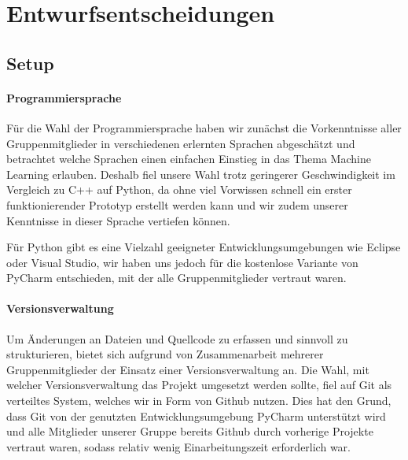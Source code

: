 \chapter{Entwurfsentscheidungen }
\label{ch:entwurf}

\section{Setup}

\subsubsection*{Programmiersprache}
Für die Wahl der Programmiersprache haben wir zunächst die Vorkenntnisse aller Gruppenmitglieder in verschiedenen erlernten Sprachen abgeschätzt und betrachtet welche Sprachen einen einfachen Einstieg in das Thema Machine Learning erlauben. Deshalb fiel unsere Wahl trotz geringerer Geschwindigkeit im Vergleich zu C++ auf Python, da ohne viel Vorwissen schnell ein erster funktionierender Prototyp erstellt werden kann und wir zudem unserer Kenntnisse in dieser Sprache vertiefen können.

Für Python gibt es eine Vielzahl geeigneter Entwicklungsumgebungen wie Eclipse oder Visual Studio, wir haben uns jedoch für die kostenlose Variante von PyCharm entschieden, mit der alle Gruppenmitglieder vertraut waren.


\subsubsection*{Versionsverwaltung}
Um Änderungen an Dateien und Quellcode zu erfassen und sinnvoll zu strukturieren, bietet sich aufgrund von Zusammenarbeit mehrerer Gruppenmitglieder der Einsatz einer Versionsverwaltung an. Die Wahl, mit welcher Versionsverwaltung das Projekt umgesetzt werden sollte, fiel auf Git als verteiltes System, welches wir in Form von Github nutzen. Dies hat den Grund, dass Git von der genutzten Entwicklungsumgebung PyCharm unterstützt wird und alle Mitglieder unserer Gruppe bereits Github durch vorherige Projekte vertraut waren, sodass relativ wenig Einarbeitungszeit erforderlich war. 


